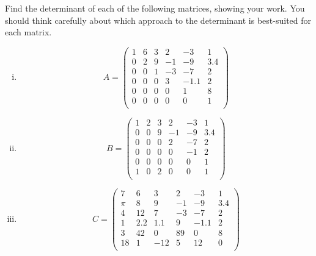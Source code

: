 \begin{question}
\normalfont
\noindent Find the determinant of each of the following matrices, showing your work. You should think carefully about which approach to the determinant is best-suited for each matrix. 

\begin{enumerate}[(i)]

\item \[A= \left( \begin{array}{cccccc}
1 & 6 & 3 & 2  & -3 & 1\\
0 & 2 & 9 & - 1 & - 9 & 3.4\\
0 & 0 & 1 & -3 & -7& 2\\
0 & 0 & 0 & 3 & -1.1 & 2\\
0 & 0 & 0 & 0 & 1& 8\\
0 & 0 & 0 & 0 & 0& 1\\
\end{array} \right)\]



\item \[B= \left( \begin{array}{cccccc}
1 & 2 & 3 & 2  & -3 & 1\\
0 & 0 & 9 & - 1 & - 9 & 3.4\\
0 & 0 & 0 & 2 & -7& 2\\
0 & 0 & 0 & 0 & -1 & 2\\
0 & 0 & 0 & 0 & 0 & 1\\
1 & 0 & 2 & 0 & 0& 1\\
\end{array} \right)\]




\item \[
C= \left( \begin{array}{cccccc}
7 & 6 & 3 & 2  & -3 & 1\\
\pi & 8 & 9 & - 1 & - 9 & 3.4\\
4 & 12 & 7 & -3 & -7& 2\\
1 & 2.2 & 1.1 & 9 & -1.1 & 2\\
3 & 42 & 0 & 89 & 0& 8\\
18 & 1 & -12 & 5 & 12& 0\\
\end{array} \right)\]
\end{enumerate}

\end{question}

